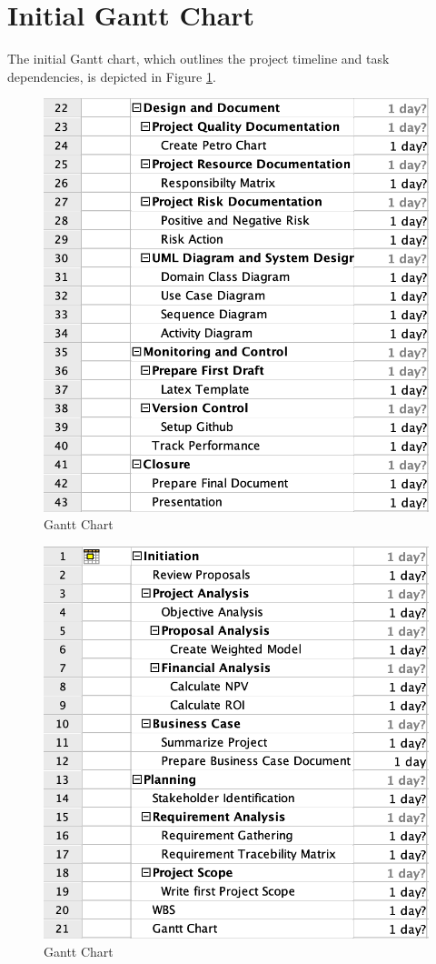 \section{Initial Gantt Chart}

The initial Gantt chart, which outlines the project timeline and task dependencies, is depicted in Figure \ref{fig:gnt1}.

\begin{figure}[ht]
    \includegraphics[width=\textwidth]{images/gantt_1.png}
    \caption{Gantt Chart}
    \label{fig:gnt1}
\end{figure}

\begin{figure}[ht]
    \includegraphics[width=\textwidth]{images/gantt_2.png}
    \caption{Gantt Chart}
    \label{fig:gnt2}
\end{figure}

\FloatBarrier
\newpage